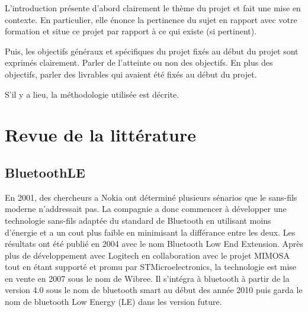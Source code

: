 \documentclass[12pt,fleqn]{article}
\begin{document}
L'introduction présente d’abord clairement le thème du projet et fait une mise en contexte. En particulier, elle énonce la pertinence du sujet en rapport avec votre formation et situe ce projet par rapport à ce qui existe (si pertinent).

Puis, les objectifs généraux et spécifiques du projet fixés au début du projet sont exprimés clairement. Parler de l'atteinte ou non des objectifs. En plus des objectifs, parler des livrables qui avaient été fixés au début du projet.

S’il y a lieu, la méthodologie utilisée est décrite.


\section{Revue de la littérature}



\subsection{BluetoothLE}
En 2001, des chercheurs a Nokia ont déterminé plusieurs sénarios que le sans-fils moderne n'addressait pas. La compagnie a donc commencer à développer une technologie sans-fils adaptée du standard de Bluetooth en utilisant moins d'énergie et a un cout plus faible en minimisant la différance entre les deux. Les résultats ont été publié en 2004 avec le nom Bluetooth Low End Extension\cite{BLEStart}. Après plus de développement avec Logitech en collaboration avec le projet MIMOSA tout en étant supporté et promu par STMicroelectronics, la technologie est mise en vente en 2007 sous le nom de Wibree\cite{BLEMarket}. Il s'intégra à bluetooth à partir de la version 4.0 sous le nom de bluetooth smart au début des année 2010 puis garda le nom de bluetooth Low Energy (LE) dans les version future\cite{BLE}.
\end{document}
